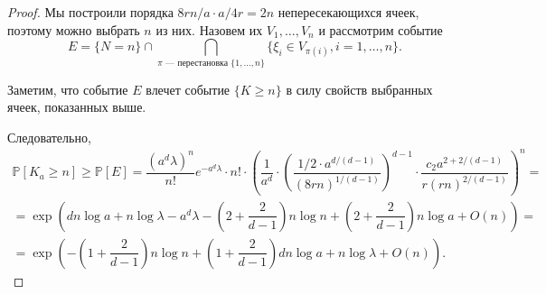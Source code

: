 \documentclass[12pt]{article}
\theoremstyle{plain}
\newtheorem{thm}{Теорема} %
\theoremstyle{definition}
\theoremstyle{remark}
\def\geq{\geqslant}
\def\leq{\leqslant}
\newcommand{\slim}{\sum\limits}
\newcommand{\PP}{\mathbb{P}}
\begin{document}
\begin{proof}
    
    Мы построили порядка $8rn/a \cdot a/4r = 2n$ непересекающихся ячеек, поэтому можно выбрать $n$ из них. Назовем их $V_1, \ldots, V_n$  и рассмотрим событие $$E = \{N=n\}\cap \bigcap\limits_{\pi \text{ --- перестановка } \{1, \ldots, n\}} \{\xi_i \in V_{\pi(i)}, i = 1, \ldots, n\}.$$
                         
    Заметим, что событие $E$ влечет событие $\{K \geq n\}$ в силу свойств выбранных ячеек, показанных выше.
  
    Следовательно, 
    \begin{multline*}
        \PP[K_a\geq n] \geq \PP[E] = \dfrac{(a^d\lambda)^n}{n!}e^{-a^d\lambda}\cdot n!
        \cdot \left(\dfrac{1}{a^d}\cdot\left(\dfrac{1/2\cdot a^{d/(d-1)}}{(8rn)^{1/(d-1)}}\right)^{d-1}\cdot
        \dfrac{c_2a^{2+ 2/(d-1)}}{r(rn)^{2/(d-1)}}\right)^n = \\
        =\exp\left(dn\log a + n\log\lambda - a^d\lambda - \left(2+\dfrac{2}{d-1}\right)n\log n + \left(2+\dfrac{2}{d-1}\right) n\log a  + O(n)\right) = \\
        =\exp\left(-\left(1+ \dfrac{2}{d-1}\right)n\log n + \left(1 + \dfrac{2}{d-1}\right)dn\log a + n\log\lambda + O(n)\right).
    \end{multline*}{}
\end{proof}{}

%
\end{document}
